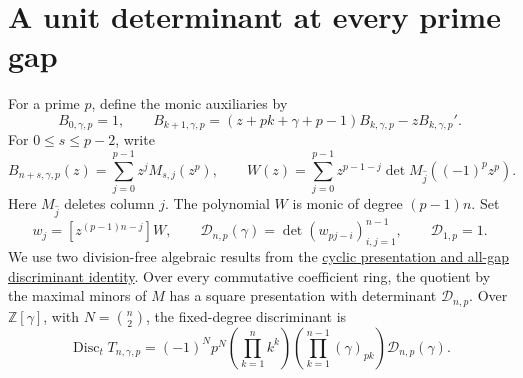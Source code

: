 \documentclass[11pt]{article}
\begin{document}
\section{A unit determinant at every prime gap}
For a prime $p$, define the monic auxiliaries by
\[
 B_{0,\gamma,p}=1,\qquad
 B_{k+1,\gamma,p}=(z+pk+\gamma+p-1)B_{k,\gamma,p}
                                  -zB_{k,\gamma,p}'.
\]
For $0\le s\le p-2$, write
\[
 B_{n+s,\gamma,p}(z)=\sum_{j=0}^{p-1}z^jM_{s,j}(z^p),\qquad
 W(z)=\sum_{j=0}^{p-1}z^{p-1-j}
             \det M_{\widehat j}((-1)^pz^p).
\]
Here $M_{\widehat j}$ deletes column $j$. The polynomial $W$ is
monic of degree $(p-1)n$. Set
\[
 w_j=[z^{(p-1)n-j}]W,\qquad
 \mathcal D_{n,p}(\gamma)=\det(w_{pj-i})_{i,j=1}^{n-1},
 \qquad \mathcal D_{1,p}=1.
\]
We use two division-free algebraic results from the
\href{gap_three_hurwitz_structure.tex}{cyclic presentation and all-gap
discriminant identity}. Over every commutative coefficient ring, the
quotient by the maximal minors of $M$ has a square presentation with
determinant $\mathcal D_{n,p}$. Over $\mathbb Z[\gamma]$, with
$N=\binom n2$, the fixed-degree discriminant is
\[
 \operatorname{Disc}_t T_{n,\gamma,p}
 =(-1)^Np^N\left(\prod_{k=1}^n k^k\right)
       \left(\prod_{k=1}^{n-1}(\gamma)_{pk}\right)
          \mathcal D_{n,p}(\gamma).                       \tag{P1}
\]
\end{document}
